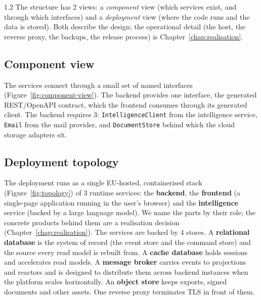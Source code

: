 \begin{spacing}{1.2}
The structure has 2 views: a \textit{component} view (which services
exist, and through which interfaces) and a \textit{deployment} view (where
the code runs and the data is stored). Both describe the design; the operational
detail (the host, the reverse proxy, the backups, the release process)
is Chapter~\ref{chap:realisation}.

\subsection{Component view}
\label{sec:component-view}

The services connect through a small set of named interfaces
(Figure~\ref{fig:component-view}). The
backend provides one interface, the generated REST/OpenAPI contract, which
the frontend consumes through its generated client. The backend requires
3: \texttt{IntelligenceClient} from the intelligence service,
\texttt{Email} from the mail provider, and \texttt{DocumentStore} behind
which the cloud storage adapters sit.


\subsection{Deployment topology}
\label{sec:deployment-topology}

The deployment runs as a single EU-hosted, containerised stack
(Figure~\ref{fig:topology}) of 3 runtime services: the \textbf{backend},
the \textbf{frontend} (a single-page application running in the user's
browser) and the \textbf{intelligence} service (backed by a large
language model). We name the parts by their role; the concrete products
behind them are a realisation decision
(Chapter~\ref{chap:realisation}). The services are backed by 4 stores.
A \textbf{relational database} is the system of
record (the event store and the command store) and the source every read
model is rebuilt from. A \textbf{cache database} holds sessions and
accelerates read models. A \textbf{message broker} carries events to
projections and reactors and is designed to distribute them across
backend instances when the platform scales
horizontally. An \textbf{object store} keeps exports, signed
documents and other assets. One reverse proxy terminates TLS in front of
them.


\end{spacing}

